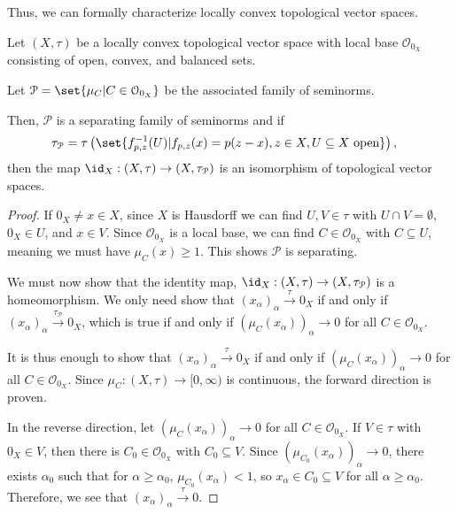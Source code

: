 \documentclass[10pt]{mypackage}
\begin{document}
Thus, we can formally characterize locally convex topological vector spaces.
\begin{theorem}
  Let $\left(X,\tau\right)$ be a locally convex topological vector space with local base $\mathcal{O}_{0_X}$ consisting of open, convex, and balanced sets.\newline

  Let $\mathcal{P} = \set{\mu_{C}| C\in \mathcal{O}_{0_X}}$ be the associated family of seminorms.\newline

  Then, $\mathcal{P}$ is a separating family of seminorms and if 
  \begin{align*}
    \tau_{\mathcal{P}} &= \tau \left(\set{f_{p,z}^{-1}(U)| f_{p,z}(x) = p(z-x),z\in X,U\subseteq X\text{ open}}\right),
  \end{align*}
  then the map $\id_{X}:\left(X,\tau\right)\rightarrow \left(X,\tau_{\mathcal{P}}\right)$ is an isomorphism of topological vector spaces.
\end{theorem}
\begin{proof}
  If $0_{X}\neq x\in X$, since $X$ is Hausdorff we can find $U,V\in \tau$ with $U\cap V = \emptyset$, $0_{X}\in U$, and $x\in V$. Since $\mathcal{O}_{0_X}$ is a local base, we can find $C\in \mathcal{O}_{0_X}$ with $C\subseteq U$, meaning we must have $\mu_{C}(x) \geq 1$. This shows $\mathcal{P}$ is separating.\newline

  We must now show that the identity map, $\id_{X}: \left(X,\tau\right)\rightarrow \left(X,\tau_{\mathcal{P}}\right)$ is a homeomorphism. We only need show that $\left(x_{\alpha}\right)_{\alpha}\xrightarrow{\tau}0_{X}$ if and only if $\left(x_{\alpha}\right)_{\alpha}\xrightarrow{\tau_{\mathcal{P}}}0_{X}$, which is true if and only if $\left(\mu_{C}\left(x_{\alpha}\right)\right)_{\alpha}\rightarrow 0$ for all $C\in \mathcal{O}_{0_X}$.\newline

  It is thus enough to show that $\left(x_{\alpha}\right)_{\alpha}\xrightarrow{\tau} 0_{X}$ if and only if $\left(\mu_{C}\left(x_{\alpha}\right)\right)_{\alpha}\rightarrow 0$ for all $C\in \mathcal{O}_{0_X}$. Since $\mu_{C}:\left(X,\tau\right) \rightarrow [0,\infty)$ is continuous, the forward direction is proven.\newline

  In the reverse direction, let $\left(\mu_{C}\left(x_{\alpha}\right)\right)_{\alpha}\rightarrow 0$ for all $C\in \mathcal{O}_{0_X}$. If $V\in \tau$ with $0_{X}\in V$, then there is $C_{0}\in \mathcal{O}_{0_X}$ with $C_{0}\subseteq V$. Since $\left(\mu_{C_{0}}\left(x_{\alpha}\right)\right)_{\alpha}\rightarrow 0$, there exists $\alpha_0$ such that for $\alpha \geq \alpha_0$, $\mu_{C_0}\left(x_{\alpha}\right) < 1$, so $x_{\alpha}\in C_{0}\subseteq V$ for all $\alpha \geq \alpha_0$. Therefore, we see that $\left(x_{\alpha}\right)_{\alpha}\xrightarrow{\tau} 0$.
\end{proof}
\end{document}

